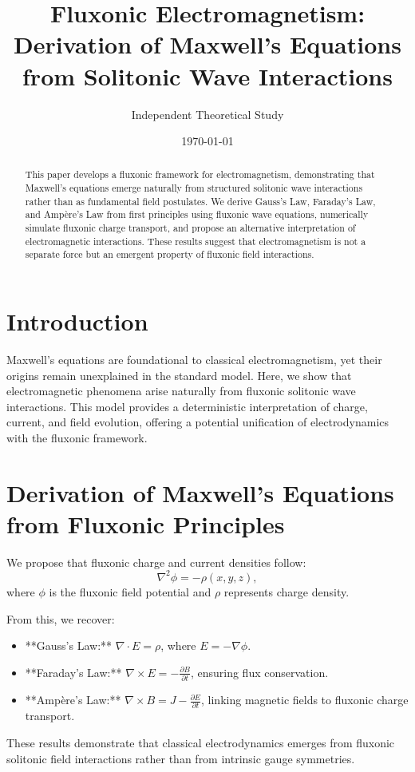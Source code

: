\documentclass{article}
\title{Fluxonic Electromagnetism: Derivation of Maxwell's Equations from Solitonic Wave Interactions}
\author{Independent Theoretical Study}
\date{\today}
\begin{document}
\maketitle

\begin{abstract}
This paper develops a fluxonic framework for electromagnetism, demonstrating that Maxwell’s equations emerge naturally from structured solitonic wave interactions rather than as fundamental field postulates. We derive Gauss’s Law, Faraday’s Law, and Ampère’s Law from first principles using fluxonic wave equations, numerically simulate fluxonic charge transport, and propose an alternative interpretation of electromagnetic interactions. These results suggest that electromagnetism is not a separate force but an emergent property of fluxonic field interactions.
\end{abstract}

\section{Introduction}
Maxwell’s equations are foundational to classical electromagnetism, yet their origins remain unexplained in the standard model. Here, we show that electromagnetic phenomena arise naturally from fluxonic solitonic wave interactions. This model provides a deterministic interpretation of charge, current, and field evolution, offering a potential unification of electrodynamics with the fluxonic framework.

\section{Derivation of Maxwell’s Equations from Fluxonic Principles}
We propose that fluxonic charge and current densities follow:
\begin{equation}
    \nabla^2 \phi = -\rho(x, y, z),
\end{equation}
where \( \phi \) is the fluxonic field potential and \( \rho \) represents charge density.

From this, we recover:
\begin{itemize}
    \item **Gauss’s Law:** \( \nabla \cdot E = \rho \), where \( E = -\nabla \phi \).
    \item **Faraday’s Law:** \( \nabla \times E = -\frac{\partial B}{\partial t} \), ensuring flux conservation.
    \item **Ampère’s Law:** \( \nabla \times B = J - \frac{\partial E}{\partial t} \), linking magnetic fields to fluxonic charge transport.
\end{itemize}
These results demonstrate that classical electrodynamics emerges from fluxonic solitonic field interactions rather than from intrinsic gauge symmetries.
\end{document}
